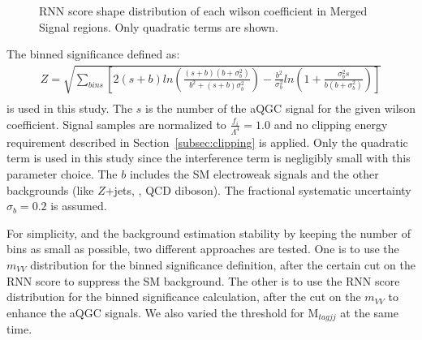 \begin{figure}[ht]
    \centering
    \caption{RNN score shape distribution of each wilson coefficient in Merged Signal regions. Only quadratic terms are shown.}
    \label{fig:2lepaQGCshapeRNN}
\end{figure}

The binned significance defined as:
%
\begin{eqnarray*}
  Z = \sqrt{\sum_{bins}\left[2(s + b)ln\left(\frac{(s + b)(b+\sigma^2_{b})}{b^2+(s+b)\sigma^2_{b}}\right) - \frac{b^2}{\sigma^2_{b}}ln\left(1+\frac{\sigma^2_{b}s}{b(b+\sigma^2_{b})}\right)\right]} \\
\end{eqnarray*}
%
is used in this study.
The $s$ is the number of the aQGC signal for the given wilson coefficient.
Signal samples are normalized to $\frac{f_{i}}{\Lambda^4}=1.0$ and no clipping energy requirement described in Section~\ref{subsec:clipping} is applied. Only the quadratic term is used in this study since the interference term is negligibly small with this parameter choice.
The $b$ includes the SM electroweak signals and the other backgrounds (like $Z$+jets, \ttbar, QCD diboson).
The fractional systematic uncertainty $\sigma_{b} = 0.2$ is assumed.

For simplicity, and the background estimation stability by keeping the number of bins as small as possible, two different approaches are tested.
One is to use the $m_{VV}$ distribution for the binned significance definition, after the certain cut on the RNN score to suppress the SM background.
The other is to use the RNN score distribution for the binned significance calculation, after the cut on the $m_{VV}$ to enhance the aQGC signals.
We also varied the threshold for $\mathrm{M}_{tagjj}$ at the same time.

